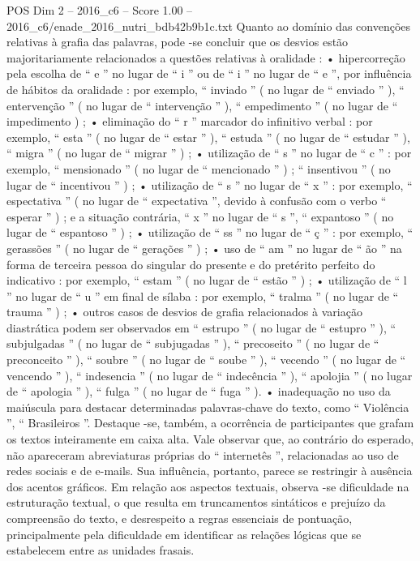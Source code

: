 \begin{textsample}{POS Dim 2 – 2016\_c6 – Score 1.00 – 2016\_c6/enade\_2016\_nutri\_bdb42b9b1c.txt}
Quanto ao domínio das convenções relativas à grafia das palavras, pode -se concluir que os desvios estão majoritariamente relacionados a questões relativas à oralidade : • hipercorreção pela escolha de “ e ” no lugar de “ i ” ou de “ i ” no lugar de “ e ”, por influência de hábitos da oralidade : por exemplo, “ inviado ” ( no lugar de “ enviado ” ), “ entervenção ” ( no lugar de “ intervenção ” ), “ empedimento ” ( no lugar de “ impedimento ) ; • eliminação do “ r ” marcador do infinitivo verbal : por exemplo, “ esta ” ( no lugar de “ estar ” ), “ estuda ” ( no lugar de “ estudar ” ), “ migra ” ( no lugar de “ migrar ” ) ; • utilização de “ s ” no lugar de “ c ” : por exemplo, “ mensionado ” ( no lugar de “ mencionado ” ) ; “ insentivou ” ( no lugar de “ incentivou ” ) ; • utilização de “ s ” no lugar de “ x ” : por exemplo, “ espectativa ” ( no lugar de “ expectativa ”, devido à confusão com o verbo “ esperar ” ) ; e a situação contrária, “ x ” no lugar de “ s ”, “ expantoso ” ( no lugar de “ espantoso ” ) ; • utilização de “ ss ” no lugar de “ ç ” : por exemplo, “ gerassões ” ( no lugar de “ gerações ” ) ; • uso de “ am ” no lugar de “ ão ” na forma de terceira pessoa do singular do presente e do pretérito perfeito do indicativo : por exemplo, “ estam ” ( no lugar de “ estão ” ) ; • utilização de “ l ” no lugar de “ u ” em final de sílaba : por exemplo, “ tralma ” ( no lugar de “ trauma ” ) ; • outros casos de desvios de grafia relacionados à variação diastrática podem ser observados em “ estrupo ” ( no lugar de “ estupro ” ), “ subjulgadas ” ( no lugar de “ subjugadas ” ), “ precoseito ” ( no lugar de “ preconceito ” ), “ soubre ” ( no lugar de “ soube ” ), “ vecendo ” ( no lugar de “ vencendo ” ), “ indesencia ” ( no lugar de “ indecência ” ), “ apolojia ” ( no lugar de “ apologia ” ), “ fulga ” ( no lugar de “ fuga ” ). • inadequação no uso da maiúscula para destacar determinadas palavras-chave do texto, como “ Violência ”, “ Brasileiros ”.
Destaque -se, também, a ocorrência de participantes que grafam os textos inteiramente em caixa alta.
Vale observar que, ao contrário do esperado, não apareceram abreviaturas próprias do “ internetês ”, relacionadas ao uso de redes sociais e de e-mails.
Sua influência, portanto, parece se restringir à ausência dos acentos gráficos.
Em relação aos aspectos textuais, observa -se dificuldade na estruturação textual, o que resulta em truncamentos sintáticos e prejuízo da compreensão do texto, e desrespeito a regras essenciais de pontuação, principalmente pela dificuldade em identificar as relações lógicas que se estabelecem entre as unidades frasais.

\end{textsample}
